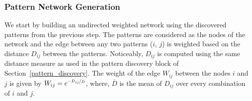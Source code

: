 \subsubsection{Pattern Network Generation}
\label{sec:network_generation}

We start by building an undirected weighted network using the discovered patterns from the previous step. The patterns are considered as the nodes of the network and the edge between any two patterns ($i$, $j$) is weighted based on the distance $D_{ij}$ between the patterns. Noticeably, $D_{ij}$ is computed using the same distance measure as used in the pattern discovery block of Section~\ref{pattern_discovery}. The weight of the edge $W_{ij}$ between the nodes $i$ and $j$ is given by $W_{ij} = e^{\nicefrac{-D_{ij}}{\bar{D}}}$, where, $\bar{D}$ is the mean of $D_{ij}$ over every combination of $i$ and $j$.



